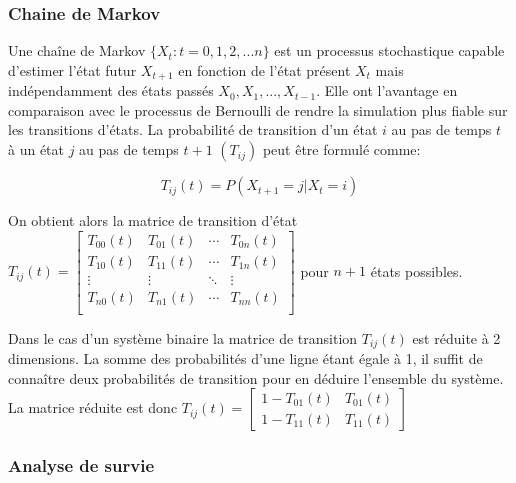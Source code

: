 \subsubsection{Chaine de Markov}
\label{Chaine de Markov}

Une chaîne de Markov $\lbrace X_{t}:t=0,1,2,...n\rbrace$ est un processus stochastique capable d'estimer l'état futur $X_{t+1}$ en fonction de l'état présent $X_{t}$ mais indépendamment des états passés $X_{0}, X_{1}, ..., X_{t-1}$. Elle ont l'avantage en comparaison avec le processus de Bernoulli de rendre la simulation plus fiable sur les transitions d'états. La probabilité de transition d'un état $i$ au pas de temps $t$ à un état $j$ au pas de temps $t+1$ $(T_{ij})$ peut être formulé comme:

\begin{equation}
T_{ij}(t)=P(X_{t+1}=j|X_{t}=i)
\end{equation}

On obtient alors la matrice de transition d'état $ T_{ij}(t)= \begin{bmatrix}
        T_{00}(t) & T_{01}(t) & \cdots & T_{0n}(t)\\
        T_{10}(t) & T_{11}(t) & \cdots & T_{1n}(t)\\
        \vdots & \vdots & \ddots & \vdots\\
        T_{n0}(t) & T_{n1}(t) & \cdots & T_{nn}(t)\\
     \end{bmatrix}$ pour $n+1$ états possibles.
     
Dans le cas d'un système binaire la matrice de transition $ T_{ij}(t)$ est réduite à 2 dimensions. La somme des probabilités d'une ligne étant égale à 1, il suffit de connaître deux probabilités de transition pour en déduire l'ensemble du système. La matrice réduite est donc $T_{ij}(t)= \begin{bmatrix}
        1-T_{01}(t) & T_{01}(t)\\
        1-T_{11}(t) & T_{11}(t)       
     \end{bmatrix}$

\subsubsection{Analyse de survie}

